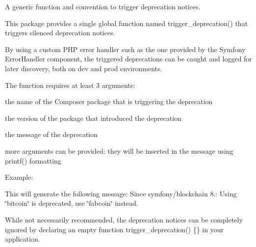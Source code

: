 A generic function and convention to trigger deprecation notices.

This package provides a single global function named {\ttfamily trigger\+\_\+deprecation()} that triggers silenced deprecation notices.

By using a custom PHP error handler such as the one provided by the Symfony Error\+Handler component, the triggered deprecations can be caught and logged for later discovery, both on dev and prod environments.

The function requires at least 3 arguments\+:
\begin{DoxyItemize}
\item the name of the Composer package that is triggering the deprecation
\item the version of the package that introduced the deprecation
\item the message of the deprecation
\item more arguments can be provided\+: they will be inserted in the message using {\ttfamily printf()} formatting
\end{DoxyItemize}

Example\+: 
\begin{DoxyCode}{0}

\end{DoxyCode}


This will generate the following message\+: {\ttfamily Since symfony/blockchain 8.\+: Using \char`\"{}bitcoin\char`\"{} is deprecated, use \char`\"{}fabcoin\char`\"{} instead.}

While not necessarily recommended, the deprecation notices can be completely ignored by declaring an empty {\ttfamily function trigger\+\_\+deprecation() \{\}} in your application. 